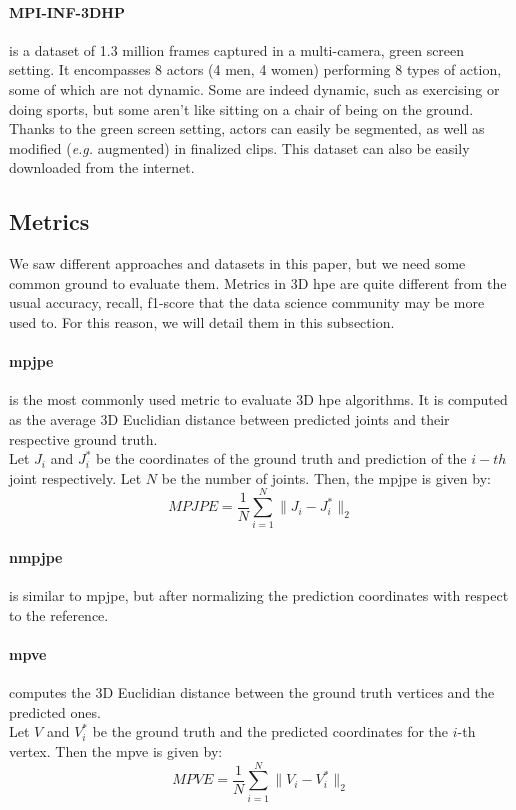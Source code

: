 \documentclass[runningheads]{llncs}
\begin{document}
\paragraph{MPI-INF-3DHP} \cite{MPI-INF-3DHP} is a dataset of 1.3 million frames captured in a multi-camera, green screen setting. It encompasses 8 actors (4 men, 4 women) performing 8 types of action, some of which are not dynamic. Some are indeed dynamic, such as exercising or doing sports, but some aren't like sitting on a chair of being on the ground. Thanks to the green screen setting, actors can easily be segmented, as well as modified (\textit{e.g.} augmented) in finalized clips. This dataset can also be easily downloaded from the internet.

\subsection{Metrics}
We saw different approaches and datasets in this paper, but we need some common ground to evaluate them. Metrics in 3D \ac{hpe} are quite different from the usual accuracy, recall, f1-score that the data science community may be more used to. For this reason, we will detail them in this subsection.
\paragraph{\ac{mpjpe}} is the most commonly used metric to evaluate 3D \ac{hpe} algorithms. It is computed as the average 3D Euclidian distance between predicted joints and their respective ground truth. \\
Let $J_i$ and $J_i^*$ be the coordinates of the ground truth and prediction of the $i-th$ joint respectively. Let $N$ be the number of joints. Then, the \ac{mpjpe} is given by:
\begin{equation}
  MPJPE = \frac{1}{N} \sum_{i=1}^N \|J_i - J_i^*\|_2
\end{equation}
\paragraph{\ac{nmpjpe}} is similar to \ac{mpjpe}, but after normalizing the prediction coordinates with respect to the reference.
\paragraph{\ac{mpve}} computes the 3D Euclidian distance between the ground truth vertices and the predicted ones. \\
Let $V$ and $V_i^*$ be the ground truth and the predicted coordinates for the $i$-th vertex. Then the \ac{mpve} is given by:
\begin{equation}
  MPVE = \frac{1}{N} \sum_{i=1}^N \|V_i - V_i^*\|_2
\end{equation}
\end{document}
